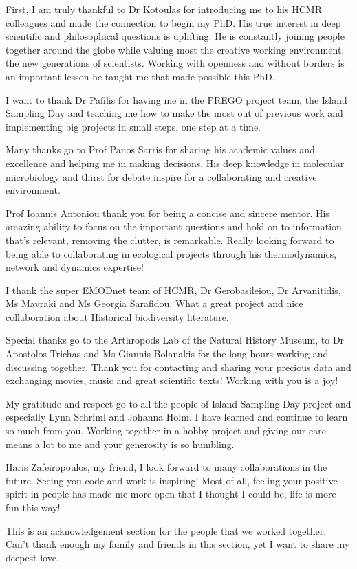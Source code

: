 \documentclass[
11pt, %
english, %
singlespacing, %
toctotoc, %
headsepline, %
]{MastersDoctoralThesis} %
\begin{document}
\begin{acknowledgements}
\addchaptertocentry{\acknowledgementname} %


First, I am truly thankful to Dr Kotoulas for introducing me to his HCMR colleagues and
made the connection to begin my PhD.
His true interest in deep scientific and philosophical questions is uplifting. He is constantly
joining people together around the globe while valuing most the creative working environment,
the new generations of scientists. Working with openness and without borders is an
important lesson he taught me that made possible this PhD.

I want to thank Dr Pafilis for having me in the PREGO project team, the Island Sampling
Day and teaching me how to make the most out
of previous work and implementing big projects in small steps, one step at a time.

Many thanks go to Prof Panos Sarris for sharing his academic values and excellence and helping me in making
decisions. His deep knowledge in molecular microbiology and thirst for debate inspire for
a collaborating and creative environment.

Prof Ioannis Antoniou thank you for being a concise and sincere mentor. His amazing ability to focus
on the important questions and hold on to information that's relevant, removing the clutter, 
is remarkable. Really looking forward to being able to collaborating in ecological 
projects through his thermodynamics, network and dynamics expertise!

I thank the super EMODnet team of HCMR, Dr Gerobasileiou, Dr Arvanitidis, Ms Mavraki and
Ms Georgia Sarafidou. What a great project and nice collaboration about Historical 
biodiversity literature.

Special thanks go to the Arthropods Lab of the Natural History Museum, to
Dr Apostolos Trichas and Ms Giannis Bolanakis for the long hours working and discussing together.
Thank you for contacting and sharing your 
precious data and exchanging movies, music and great scientific texts! Working with you is a joy!

My gratitude and respect go to all the people of Island Sampling Day project and especially
Lynn Schriml and Johanna Holm. I have learned and continue to learn so much from 
you. Working together in a hobby project and giving our care means a lot to me and your
generosity is so humbling.

Haris Zafeiropoulos, my friend, I look forward to many collaborations in the future. Seeing you code and work
is inspiring! Most of all, feeling your positive spirit in people has made me more
open that I thought I could be, life is more fun this way!

This is an acknowledgement section for the people that we worked together. Can't 
thank enough my family and friends in this section, yet I want to share my deepest love.

\end{acknowledgements}
\end{document}
